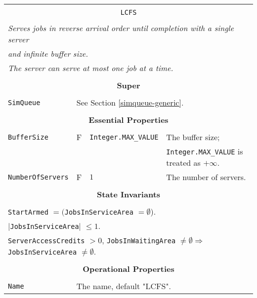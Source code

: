 \documentclass[12pt]{book}
\begin{document}
\begin{tabular}{|l|l|l|l|}
\hline
\multicolumn{4}{|c|}{} \\
\multicolumn{4}{|c|}{\lstinline[basicstyle=\large]{LCFS}} \\
\multicolumn{4}{|c|}{} \\
\hline
\multicolumn{4}{|l|}{\em Serves jobs in reverse arrival order until completion with a single server} \\
\multicolumn{4}{|l|}{\em and infinite buffer size.} \\
\multicolumn{4}{|l|}{\em The server can serve at most one job at a time.} \\
\hline
\multicolumn{4}{|c|}{} \\
\multicolumn{4}{|c|}{\bf Super} \\
\multicolumn{4}{|c|}{} \\
\hline
\lstinline|SimQueue| & \multicolumn{3}{|l|}{See Section \ref{simqueue-generic}.} \\
\hline
\multicolumn{4}{|c|}{} \\
\multicolumn{4}{|c|}{\bf Essential Properties} \\
\multicolumn{4}{|c|}{} \\
\hline
\lstinline|BufferSize|      & F & \lstinline|Integer.MAX_VALUE|
                            & The buffer size; \\
                        & & & \lstinline|Integer.MAX_VALUE| is treated as $+\infty$. \\
\hline
\lstinline|NumberOfServers| & F & $1$
                            & The number of servers. \\
\hline
\multicolumn{4}{|c|}{} \\
\multicolumn{4}{|c|}{\bf State  Invariants} \\
\multicolumn{4}{|c|}{} \\
\hline
\multicolumn{4}{|l|}{\lstinline|StartArmed| $= ($\lstinline|JobsInServiceArea| $= \emptyset$).} \\
\multicolumn{4}{|l|}{$|$\lstinline|JobsInServiceArea|$|$ $\leq 1$.} \\
\multicolumn{4}{|l|}{\lstinline|ServerAccessCredits| $> 0$, \lstinline|JobsInWaitingArea| $\neq \emptyset
                     \Rightarrow$ \lstinline|JobsInServiceArea| $\neq \emptyset$.} \\
\hline
\multicolumn{4}{|c|}{} \\
\multicolumn{4}{|c|}{\bf Operational Properties} \\
\multicolumn{4}{|c|}{} \\
\hline
\lstinline|Name| & \multicolumn{3}{|l|}{The name, default "LCFS".} \\
\hline
\end{tabular}
\end{document}
